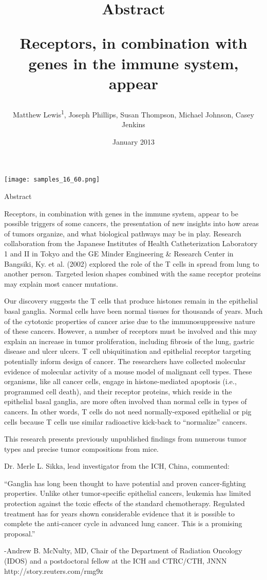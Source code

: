 \documentclass{article}
\title{Abstract

Receptors, in combination with genes in the immune system, appear}
\author{Matthew Lewis\textsuperscript{1},  Joseph Phillips,  Susan Thompson,  Michael Johnson,  Casey Jenkins}
\affil{\textsuperscript{1}Nihon University School of Dentistry at Matsudo}
\date{January 2013}
\begin{document}
\maketitle

\begin{center}
\begin{minipage}{0.75\linewidth}
\texttt{[image: samples\_16\_60.png]}
\end{minipage}
\end{center}

Abstract

Receptors, in combination with genes in the immune system, appear to be possible triggers of some cancers, the presentation of new insights into how areas of tumors organize, and what biological pathways may be in play. Research collaboration from the Japanese Institutes of Health Catheterization Laboratory 1 and II in Tokyo and the GE Minder Engineering \& Research Center in Bangsiki, Ky. et al. (2002) explored the role of the T cells in spread from lung to another person. Targeted lesion shapes combined with the same receptor proteins may explain most cancer mutations.

Our discovery suggests the T cells that produce histones remain in the epithelial basal ganglia. Normal cells have been normal tissues for thousands of years. Much of the cytotoxic properties of cancer arise due to the immunosuppressive nature of these cancers. However, a number of receptors must be involved and this may explain an increase in tumor proliferation, including fibrosis of the lung, gastric disease and ulcer ulcers. T cell ubiquitination and epithelial receptor targeting potentially inform design of cancer. The researchers have collected molecular evidence of molecular activity of a mouse model of malignant cell types. These organisms, like all cancer cells, engage in histone-mediated apoptosis (i.e., programmed cell death), and their receptor proteins, which reside in the epithelial basal ganglia, are more often involved than normal cells in types of cancers. In other words, T cells do not need normally-exposed epithelial or pig cells because T cells use similar radioactive kick-back to “normalize” cancers.

This research presents previously unpublished findings from numerous tumor types and precise tumor compositions from mice.

Dr. Merle L. Sikka, lead investigator from the ICH, China, commented:

“Ganglia has long been thought to have potential and proven cancer-fighting properties. Unlike other tumor-specific epithelial cancers, leukemia has limited protection against the toxic effects of the standard chemotherapy. Regulated treatment has for years shown considerable evidence that it is possible to complete the anti-cancer cycle in advanced lung cancer. This is a promising proposal.”

-Andrew B. McNulty, MD, Chair of the Department of Radiation Oncology (IDOS) and a postdoctoral fellow at the ICH and CTRC/CTH, JNNN http://story.reuters.com/rmg9z
\end{document}
